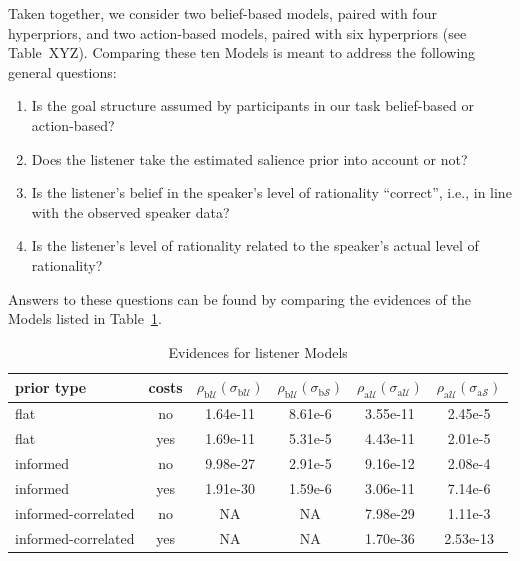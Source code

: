 Taken together, we consider two belief-based models, paired with four
hyperpriors, and two action-based models, paired with six hyperpriors
(see Table~XYZ). Comparing these ten Models is meant
to address the following general questions:
\begin{enumerate}
\item Is the goal structure assumed by participants in our task
  belief-based or action-based?
\item Does the listener take the estimated salience prior into account
  or not?
\item Is the listener's belief in the speaker's level of rationality
  ``correct'', i.e., in line with the observed speaker data?
\item Is the listener's level of rationality related to the speaker's
  actual level of rationality?
\end{enumerate}

Answers to these questions can be found by comparing the evidences of
the Models listed in Table~\ref{table:listener mod}.
%
\begin{table}[htb] 
\caption{Evidences for listener Models}
  \centering 
  \begin{tabular}{lccccc}
    prior type & costs &
    $\rho_{\mathrm{b}\mathcal{U}}(\sigma_{\mathrm{b}\mathcal{U}})$ 
    & $\rho_{\mathrm{b}\mathcal{U}}(\sigma_{\mathrm{b}\mathcal{S}})$
    & $\rho_{\mathrm{a}\mathcal{U}}(\sigma_{\mathrm{a}\mathcal{U}})$
    & $\rho_{\mathrm{a}\mathcal{U}}(\sigma_{\mathrm{a}\mathcal{S}})$
    \\ \midrule
    flat
    & no
    & 1.64e-11
    & 8.61e-6
    & 3.55e-11
    & 2.45e-5
    \\ 
    flat
    & yes
    & 1.69e-11
    & 5.31e-5
    & 4.43e-11
    & 2.01e-5
    \\ \addlinespace[0.1cm]
    informed
    & no
    & 9.98e-27
    & 2.91e-5
    & 9.16e-12
    & 2.08e-4
    \\
    informed
    & yes
    & 1.91e-30
    & 1.59e-6
    & 3.06e-11
    & 7.14e-6
    \\ \addlinespace[0.1cm]
    informed-correlated
    & no
    & NA
    & NA
    & 7.98e-29
    & 1.11e-3
    \\
    informed-correlated
    & yes
    & NA
    & NA
    & 1.70e-36
    & 2.53e-13
    \\
  \end{tabular}
  \label{table:listener mod}
\end{table}

